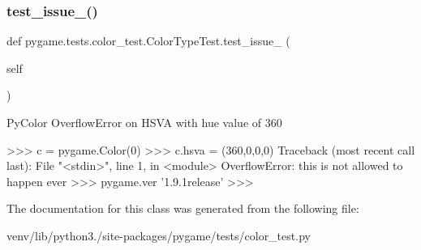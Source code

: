 \subsubsection{\texorpdfstring{test\+\_\+issue\+\_()}{test\_issue\_269()}}
{\footnotesize\ttfamily def pygame.\+tests.\+color\+\_\+test.\+Color\+Type\+Test.\+test\+\_\+issue\+\_ (\begin{DoxyParamCaption}\item[{}]{self }\end{DoxyParamCaption})}

\begin{DoxyVerb}PyColor OverflowError on HSVA with hue value of 360

   >>> c = pygame.Color(0)
   >>> c.hsva = (360,0,0,0)
   Traceback (most recent call last):
     File "<stdin>", line 1, in <module>
   OverflowError: this is not allowed to happen ever
   >>> pygame.ver
   '1.9.1release'
   >>>\end{DoxyVerb}
 

The documentation for this class was generated from the following file\+:\begin{DoxyCompactItemize}
\item 
venv/lib/python3./site-\/packages/pygame/tests/color\+\_\+test.\+py\end{DoxyCompactItemize}
